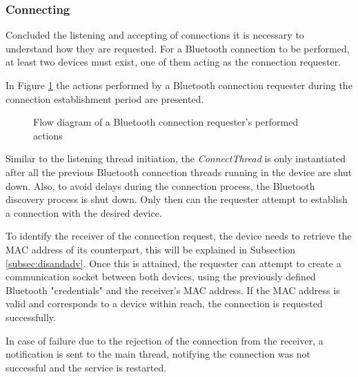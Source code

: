 \subsubsection{Connecting}
\label{subsubsec:connecting}

Concluded the listening and accepting of connections it is necessary to understand how they are requested. For a Bluetooth connection to be performed, at least two devices must exist, one of them acting as the connection requester.

In Figure \ref{fig:btrequester} the actions performed by a Bluetooth connection requester during the connection establishment period are presented.

\begin{figure}[ht]
	\noindent{}
	\caption{\label{fig:btrequester} Flow diagram of a Bluetooth connection requester's performed actions}
\end{figure}

Similar to the listening thread initiation, the \textit{ConnectThread} is only instantiated after all the previous Bluetooth connection threads running in the device are shut down. Also, to avoid delays during the connection process, the Bluetooth discovery process is shut down. Only then can the requester attempt to establish a connection with the desired device.

To identify the receiver of the connection request, the device needs to retrieve the \gls{MAC} address of its counterpart, this will be explained in Subsection \ref{subsec:disandadv}. Once this is attained, the requester can attempt to create a communication socket between both devices, using the previously defined Bluetooth "credentials" and the receiver's \gls{MAC} address. If the \gls{MAC} address is valid and corresponds to a device within reach, the connection is requested successfully.

In case of failure due to the rejection of the connection from the receiver, a notification is sent to the main thread, notifying the connection was not successful and the service is restarted.

